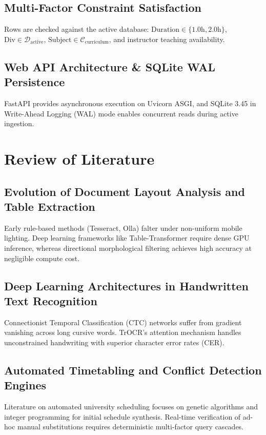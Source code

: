 \documentclass[12pt,letterpaper]{report}
\begin{document}
\section{Multi-Factor Constraint Satisfaction}
Rows are checked against the active database: $\text{Duration} \in \{1.0\text{h}, 2.0\text{h}\}$, $\text{Div} \in \mathcal{D}_{\text{active}}$, $\text{Subject} \in \mathcal{C}_{\text{curriculum}}$, and instructor teaching availability.

\section{Web API Architecture \& SQLite WAL Persistence}
FastAPI provides asynchronous execution on Uvicorn ASGI, and SQLite 3.45 in Write-Ahead Logging (WAL) mode enables concurrent reads during active ingestion.

\chapter{Review of Literature}

\section{Evolution of Document Layout Analysis and Table Extraction}
Early rule-based methods (Tesseract, Olla) falter under non-uniform mobile lighting. Deep learning frameworks like Table-Transformer require dense GPU inference, whereas directional morphological filtering achieves high accuracy at negligible compute cost.

\section{Deep Learning Architectures in Handwritten Text Recognition}
Connectionist Temporal Classification (CTC) networks suffer from gradient vanishing across long cursive words. TrOCR's attention mechanism handles unconstrained handwriting with superior character error rates (CER).

\section{Automated Timetabling and Conflict Detection Engines}
Literature on automated university scheduling focuses on genetic algorithms and integer programming for initial schedule synthesis. Real-time verification of ad-hoc manual substitutions requires deterministic multi-factor query cascades.
\end{document}
